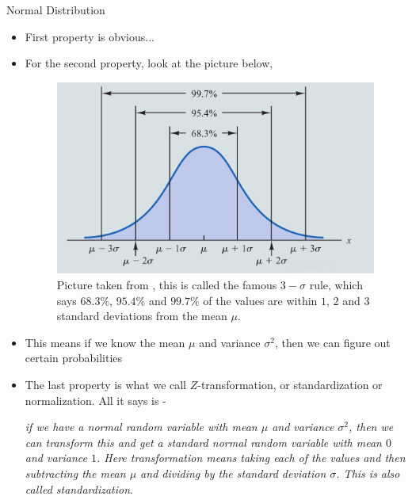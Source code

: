 \documentclass[8pt, usepdftitle = false]{beamer}
\begin{document}
\begin{frame}[allowframebreaks]{Normal Distribution}
\begin{itemize}
\begin{varblock}{Some Properties of Normal Distribution}
\begin{itemize}
\medskip

\end{itemize}

\end{varblock}

\framebreak

\item First property is obvious...


\item For the second property, look at the picture below,

\begin{figure}[H]
\centering
\includegraphics[scale = .25]{Images/PDF_Normal_percentiles.png}
\caption{Picture taken from \cite{anderson_statistics_2020}, this is called the famous $3-\sigma$ rule, which says $68.3\%$, $95.4\%$ and $99.7\%$ of the values are within $1$, $2$ and $3$ standard deviations from the mean $\mu$.}
\end{figure}



\item This means if we know the mean $\mu$ and variance $\sigma^2$, then we can figure out certain probabilities

\framebreak




\item The last property is what we call \alert{$Z$-transformation, or standardization or normalization}. All it says is - 

\medskip

\emph{if we have a normal random variable with mean $\mu$ and variance $\sigma^2$, then we can transform this and get a standard normal random variable with mean $0$ and variance $1$. Here transformation means taking each of the values and then subtracting the mean $\mu$ and dividing by the standard deviation $\sigma$. This is also called \alert{standardization}}.



\end{itemize}
\end{frame}
\end{document}
